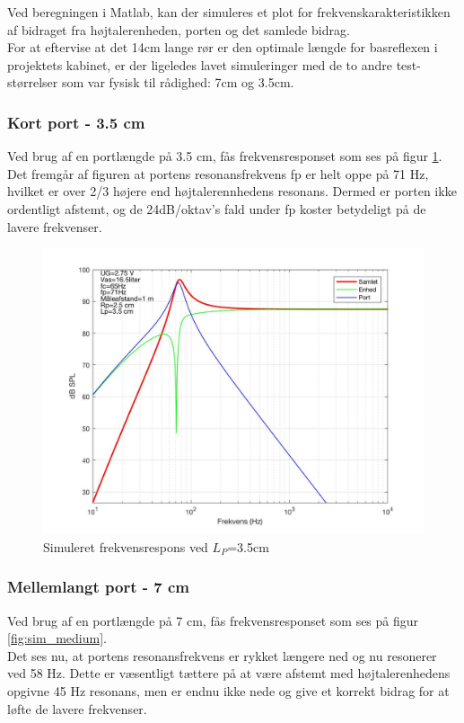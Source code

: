 Ved beregningen i Matlab, kan der simuleres et plot for frekvenskarakteristikken af bidraget fra højtalerenheden, porten og det samlede bidrag. \\
For at eftervise at det 14cm lange rør er den optimale længde for basreflexen i projektets kabinet, er der ligeledes lavet simuleringer med de to andre test-størrelser som var fysisk til rådighed: 7cm og 3.5cm.

\subsubsection{Kort port - 3.5 cm}

Ved brug af en portlængde på 3.5 cm, fås frekvensresponset som ses på figur \ref{fig:sim_kort}. \\
Det fremgår af figuren at portens resonansfrekvens fp er helt oppe på 71 Hz, hvilket er over 2/3 højere end højtalerennhedens resonans. Dermed er porten ikke ordentligt afstemt, og de 24dB/oktav's fald under fp koster betydeligt på de lavere frekvenser. 

\begin{figure}[h!]
	\centering
	\includegraphics[width=.75\textwidth]{Pics/sim_kort}
	\caption{Simuleret frekvensrespons ved $L_P$=3.5cm } 
	\label{fig:sim_kort}
\end{figure}

\subsubsection{Mellemlangt port - 7 cm}

Ved brug af en portlængde på 7 cm, fås frekvensresponset som ses på figur \ref{fig:sim_medium}. \\
Det ses nu, at portens resonansfrekvens er rykket længere ned og nu resonerer ved 58 Hz. Dette er væsentligt tættere på at være afstemt med højtalerenhedens opgivne 45 Hz resonans, men er endnu ikke nede og give et korrekt bidrag for at løfte de lavere frekvenser. 


